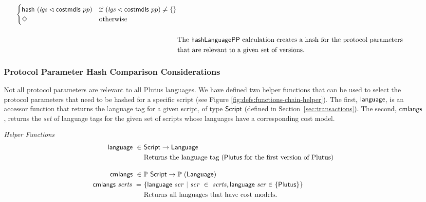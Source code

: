 \begin{figure*}[htb]
\begin{align*}
\begin{cases}
         \mathsf{hash}~(\mathit{lgs} \lhd \mathsf{costmdls}~{pp})
                           & \text{if~} (\mathit{lgs} \lhd \mathsf{costmdls}~{pp}) \neq \{\} \\
              \Diamond & \text{otherwise} \\
      \end{cases} \\[3ex]
    & \text{The $\mathsf{hashLanguagePP}$ calculation creates a hash for the protocol parameters} \\ & \text{that are relevant to
    a given set of versions.}
  \end{align*}
  \caption{Definitions Used in Protocol Parameters}
  \label{fig:defs:protocol-parameters}
\end{figure*}

\subsubsection{Protocol Parameter Hash Comparison Considerations}

Not all protocol parameters are relevant to all Plutus languages.
We have defined two helper functions that can be used to select the protocol parameters that need to be hashed for a specific script
(see Figure \ref{fig:defs:functions-chain-helper}). The first, $\mathsf{language}$, is an accessor function that returns the language tag for a given script, of type
$\mathsf{Script}$ (defined in Section~\ref{sec:transactions}).
The second, $\mathsf{cmlangs}$, returns the \emph{set} of language tags for the given set of scripts whose languages have a corresponding cost model.

\begin{figure*}[htb]
  \emph{Helper Functions}
  \begin{align*}
    \fun{language} ~\in~& \Script \to \Language \\
    &\text{Returns the language tag ($\Plutus$ for the first version of Plutus)}
    \nextdef
    \fun{cmlangs} ~\in~& \powerset{\Script} \to \powerset{(\Language)} \\
    \fun{cmlangs}~ \var{scrts} ~=~ & \{ \fun{language}~\var{scr} ~\vert~
      \var{scr}~\in~ \var{scrts}, \fun{language}~\var{scr} \in \{\Plutus\}  \}\\
    &\text{Returns all languages that have cost models.}
  \end{align*}
  \caption{Helper functions for Languages and Cost Model}
  \label{fig:defs:functions-chain-helper}
\end{figure*}
